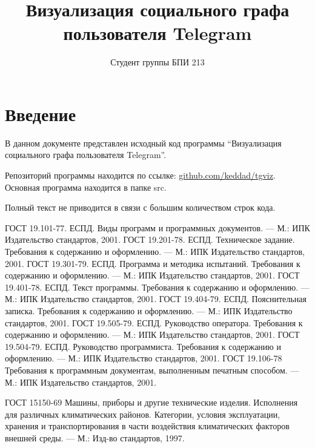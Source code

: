 \documentclass{TechDoc}
\title{Визуализация социального графа пользователя Telegram}
\author{Студент группы БПИ 213}{Н. А. Бирюлин}
\begin{document}
    \maketitle
    
    \tableofcontents
    
    \section{Введение}

    В данном документе представлен исходный код программы ``Визуализация социального графа пользователя Telegram''.

    Репозиторий программы находится по ссылке: \href{https://github.com/keddad/tgviz}{github.com/keddad/tgviz}.
    Основная программа находится в папке src.

    Полный текст не приводится в связи с большим количеством строк кода.
    
    \begin{thebibliography}{9}
         ГОСТ 19.101-77. ЕСПД. Виды программ и программных документов. --- М.: ИПК Издательство стандартов, 2001.
         ГОСТ 19.201-78. ЕСПД. Техническое задание. Требования к содержанию и оформлению. --- М.: ИПК Издательство стандартов, 2001.
         ГОСТ 19.301-79. ЕСПД. Программа и методика испытаний. Требования к содержанию и оформлению. --- М.: ИПК Издательство стандартов, 2001.
         ГОСТ 19.401-78. ЕСПД. Текст программы. Требования к содержанию и оформлению. --- М.: ИПК Издательство стандартов, 2001.
         ГОСТ 19.404-79. ЕСПД. Пояснительная записка. Требования к содержанию и оформлению. --- М.: ИПК Издательство стандартов, 2001.
         ГОСТ 19.505-79. ЕСПД. Руководство оператора. Требования к содержанию и оформлению. --- М.: ИПК Издательство стандартов, 2001.
         ГОСТ 19.504-79. ЕСПД. Руководство программиста. Требования к содержанию и оформлению. --- М.: ИПК Издательство стандартов, 2001.
         ГОСТ 19.106-78 Требования к программным документам, выполненным печатным способом. --- М.: ИПК Издательство стандартов, 2001.
  
         ГОСТ 15150-69 Машины, приборы и другие технические изделия. Исполнения для различных климатических районов. Категории, условия эксплуатации, хранения и транспортирования в части воздействия климатических факторов внешней среды. --- М.: Изд-во стандартов, 1997.
    \end{thebibliography} 

    \registrationList
        
\end{document}
